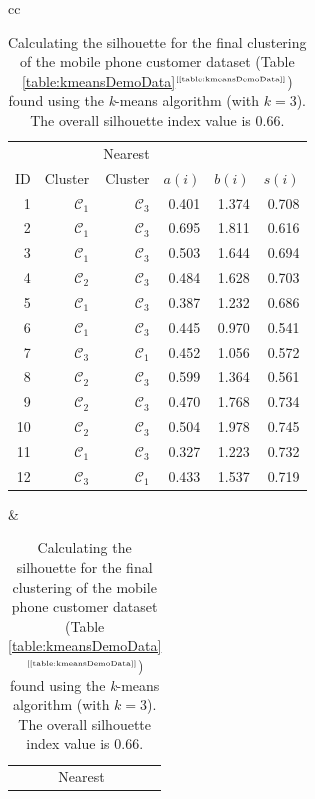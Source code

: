\documentclass[xcolor={table}]{beamer}
\newcommand{\Toprule}[0]{\hline}
\newcommand{\Midrule}[0]{\hline}
\newcommand{\Botrule}[0]{\hline}
\newcommand{\featN}[1]{\textsc{#1}}
\newcommand{\ourRef}[1]{\ref{#1}$^{\text{\tiny[\pageref{#1}]}}$}
\begin{document}
 \begin{frame} 
\begin{table}[!t]
\caption{Calculating the silhouette for the final clustering of the mobile phone customer dataset (Table \ourRef{table:kmeansDemoData}) found using the \textit{k}-means algorithm (with $k=3$). The overall silhouette index value is $0.66$. }
\label{table:silhouetteDemo}
\begin{scriptsize}
{\setlength{\tabcolsep}{0em}
\begin{tabular}{cc}
\Toprule
\begin{minipage}{0.5\textwidth}
\raggedright
{\setlength{\tabcolsep}{0.1em}
	\begin{tabular*}{12.0pc}{@{\extracolsep{\fill}} rrrrrr @{}}
~	 & ~ & Nearest &  ~ \\
\featN{ID}	 & Cluster & Cluster & $a(i)$ & $b(i)$ & $s(i)$ \\
\Midrule
1 & $\mathcal{C}_1$ & $\mathcal{C}_3$ & 0.401 & 1.374 & 0.708 \\ 
2 & $\mathcal{C}_1$ & $\mathcal{C}_3$ & 0.695 & 1.811 & 0.616 \\ 
3 & $\mathcal{C}_1$ & $\mathcal{C}_3$ & 0.503 & 1.644 & 0.694 \\ 
4 & $\mathcal{C}_2$ & $\mathcal{C}_3$ & 0.484 & 1.628 & 0.703 \\ 
5 & $\mathcal{C}_1$ & $\mathcal{C}_3$ & 0.387 & 1.232 & 0.686 \\ 
6 & $\mathcal{C}_1$ & $\mathcal{C}_3$ & 0.445 & 0.970 & 0.541 \\ 
7 & $\mathcal{C}_3$ & $\mathcal{C}_1$ & 0.452 & 1.056 & 0.572 \\ 
8 & $\mathcal{C}_2$ & $\mathcal{C}_3$ & 0.599 & 1.364 & 0.561 \\ 
9 & $\mathcal{C}_2$ & $\mathcal{C}_3$ & 0.470 & 1.768 & 0.734 \\ 
10 & $\mathcal{C}_2$ & $\mathcal{C}_3$ & 0.504 & 1.978 & 0.745 \\ 
11 & $\mathcal{C}_1$ & $\mathcal{C}_3$ & 0.327 & 1.223 & 0.732 \\ 
12 & $\mathcal{C}_3$ & $\mathcal{C}_1$ & 0.433 & 1.537 & 0.719 \\ 
\Botrule
\end{tabular*}
}
\end{minipage}
&
\begin{minipage}{0.5\textwidth}
\raggedleft
{\setlength{\tabcolsep}{0.1em}
	\begin{tabular*}{12.0pc}{@{\extracolsep{\fill}} rrrrrr @{}}
~	 & ~ & Nearest &  ~ \\

\end{tabular*}}
\end{minipage}
\end{tabular}}
\end{scriptsize}
\end{table}
\end{frame}
\end{document}
